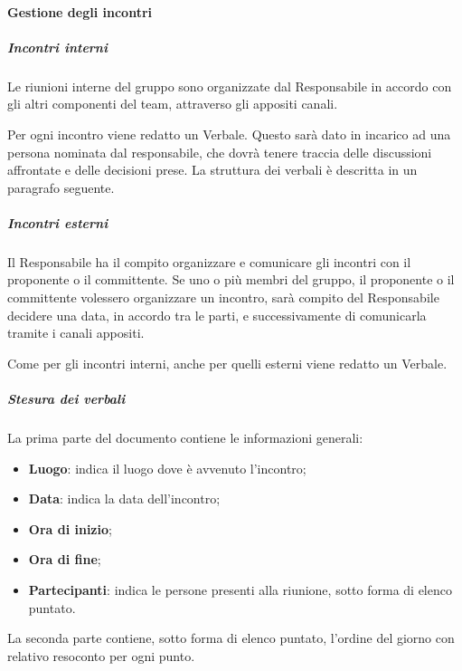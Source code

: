    		
   		
   	\paragraph{Gestione degli incontri}
   	
   		\subparagraph*{Incontri interni}
   		Le riunioni interne del gruppo sono organizzate dal Responsabile in accordo con gli altri componenti del team, attraverso gli appositi canali.
   		
   		\noindent Per ogni incontro viene redatto un Verbale. Questo sarà dato in incarico ad una persona nominata dal responsabile, che dovrà tenere traccia delle discussioni affrontate e delle decisioni prese. La struttura dei verbali è descritta in un paragrafo seguente.
   		
   		\subparagraph*{Incontri esterni}
   		Il Responsabile ha il compito organizzare e comunicare gli incontri con il proponente o il committente. Se uno o più membri del gruppo, il proponente o il committente volessero organizzare un incontro, sarà compito del Responsabile decidere una data, in accordo tra le parti, e successivamente di comunicarla tramite i canali appositi.
   		
   		\noindent Come per gli incontri interni, anche per quelli esterni viene redatto un Verbale.
   		\subparagraph*{Stesura dei verbali}
   		La prima parte del documento contiene le informazioni generali:
   		\begin{itemize}
   			\item \textbf{Luogo}: indica il luogo dove è avvenuto l'incontro;
   			\item \textbf{Data}: indica la data dell'incontro;
   			\item \textbf{Ora di inizio};
   			\item \textbf{Ora di fine};
   			\item \textbf{Partecipanti}: indica le persone presenti alla riunione, sotto forma di elenco puntato.
   		\end{itemize}
   		La seconda parte contiene, sotto forma di elenco puntato, l'ordine del giorno con relativo resoconto per ogni punto.
   	
   
   
